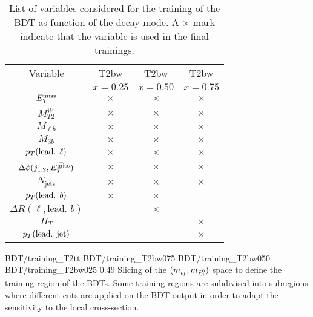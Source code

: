 \begin{table}[h!]
\begin{center}
\begin{tabular}{|c|ccc|}
                    \hline
                    Variable                            & T2bw      & T2bw      & T2bw      \\
                                                        & $x=0.25$  & $x=0.50$  & $x=0.75$  \\
                    \hline
                    $E_T^\text{miss}$                              & $\times$  & $\times$  & $\times$  \\ 
                    $M_{T2}^W$                          & $\times$  & $\times$  & $\times$  \\
                    $M_{\ell b}$                        & $\times$  & $\times$  & $\times$  \\
                    $M_{3 b}$                           & $\times$  & $\times$  & $\times$  \\
                    $p_T(\text{lead. } \ell)$           & $\times$  & $\times$  & $\times$  \\   
                    $\Delta\phi(j_{1,2},\vec{E_T^\text{miss}})$    & $\times$  & $\times$  & $\times$  \\
                    $N_\text{jets}$                     & $\times$  & $\times$  & $\times$  \\
                    \hline
                    $p_T(\text{lead. } b)$              & $\times$  & $\times$  &           \\
                    $\Delta R( \ell, \text{lead. } b)$  &           & $\times$  &           \\
                    $H_{T}$                             &           &           & $\times$  \\
                    $p_T(\text{lead. jet})$             &           &           & $\times$  \\
                    \hline
                \end{tabular}
                \caption{List of variables considered for the training of the BDT 
                as function of the decay mode. A $\times$ mark indicate that the variable 
                is used in the final trainings.}
                \label{tab:BDTVariableUsage}
            \end{center}
        \end{table}

                              {BDT/training_T2tt}
                              {BDT/training_T2bw075}
                              {BDT/training_T2bw050}
                              {BDT/training_T2bw025}
                              {0.49}
                              {Slicing of the $(m_{\tilde{t}_1},m_{\tilde{\chi}_1^0})$ space 
                              to define the training region of the BDTs. Some training 
                              regions are subdivised into subregions where different cuts 
                              are applied on the BDT output in order to adapt the sensitivity 
                              to the local cross-section. }

